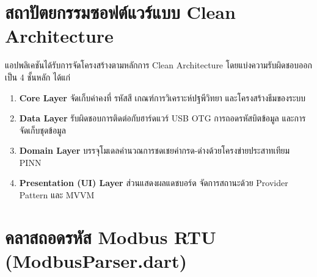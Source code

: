 \section{สถาปัตยกรรมซอฟต์แวร์แบบ Clean Architecture}

แอปพลิเคชันได้รับการจัดโครงสร้างตามหลักการ Clean Architecture โดยแบ่งความรับผิดชอบออกเป็น 4 ชั้นหลัก ได้แก่
\begin{enumerate}
    \item \textbf{Core Layer} จัดเก็บค่าคงที่ รหัสสี เกณฑ์การวิเคราะห์ปฐพีวิทยา และโครงสร้างธีมของระบบ
    \item \textbf{Data Layer} รับผิดชอบการติดต่อกับฮาร์ดแวร์ USB OTG การถอดรหัสบิตข้อมูล และการจัดเก็บชุดข้อมูล
    \item \textbf{Domain Layer} บรรจุโมเดลคำนวณการชดเชยค่ากรด-ด่างด้วยโครงข่ายประสาทเทียม PINN
    \item \textbf{Presentation (UI) Layer} ส่วนแสดงผลแดชบอร์ด จัดการสถานะด้วย Provider Pattern และ MVVM
\end{enumerate}

\section{คลาสถอดรหัส Modbus RTU (ModbusParser.dart)}

